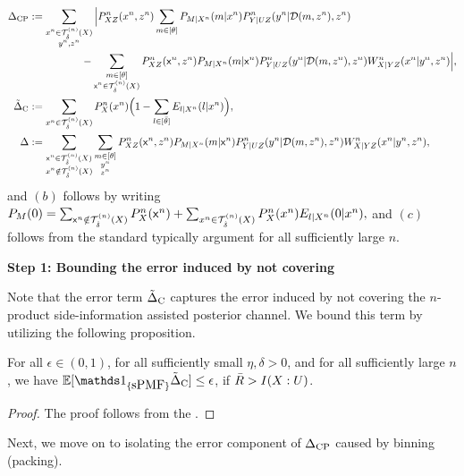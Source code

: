 \begin{align*}
    \Delta_{\text{CP}} &:= \sum_{\substack{x^n \in \mathcal{T}_{\hat{\delta}}^{(n)}({X}) \\ y^n, z^n}}
    \Big|P_{XZ}^n(x^n,z^n) \sum_{m\in [\theta]}P_{M|X^n}(m|x^n) P^n_{Y|UZ}(y^n|\mathcal{D}(m,z^n),z^n) \\
    & \hspace{50pt} - \sum_{\substack{m \in [\theta] \\ \mathsf{x}^n \in \mathcal{T}_{\hat{\delta}}^{(n)}({X})}}  P^n_{XZ}(\mathsf{x}^n,z^n)P_{M|X^n}(m|\mathsf{x}^n) P^n_{Y|UZ}(y^n|\mathcal{D}(m,z^n),z^n) W^n_{X|YZ}(x^n
    |y^n,z^n)
    \Big|,\\
    \Tilde{\Delta}_{\text{C}} &:= \sum_{x^n \in \mathcal{T}_{\hat{\delta}}^{(n)}({X})} P^n_{X}(x^n) \Big(1 - \sum_{l\in[\bar{\theta}]}E_{l|X^n}(l|x^n)\Big),  \\
    {\Delta} &:= \sum_{\substack{\mathsf{x}^n \in \mathcal{T}_{\hat{\delta}}^{(n)}({X}) \\ x^n \notin \mathcal{T}_{\hat{\delta}}^{(n)}({X})}} \sum_{\substack{m \in [\theta] \\y^n \\ z^n }}
     P^n_{XZ}(\mathsf{x}^n,z^n)P_{M|X^n}(m|\mathsf{x}^n) P^n_{Y|UZ}(y^n|\mathcal{D}(m,z^n),z^n) W^n_{X|YZ}(x^n
    |y^n,z^n),
\end{align*}
and $(b)$ follows by writing $P_M(0) = \sum_{\mathsf{x}^n \notin \mathcal{T}_{\hat{\delta}}^{(n)}({X})} P^n_X(\mathsf{x}^n) + \sum_{x^n \in \mathcal{T}_{\hat{\delta}}^{(n)}({X})} P^n_X(x^n)E_{l|X^n}(0|x^n),$ and $(c)$ follows from the standard typically argument for all sufficiently large $n$. 

\noindent \textbf{Step 1: Bounding the error induced by not covering}

\noindent Note that the error term $\Tilde{\Delta}_{\text{C}}$ captures the error induced by not covering the $n$-product side-information assisted posterior channel. We bound this term by utilizing the following proposition.
\begin{proposition} For all $\epsilon \in (0,1)$, for all sufficiently small $\eta,\delta >0$, and for all sufficiently large $n$, we have $\EE[\Ipmf \notce] \leq \epsilon$, if $\bar{R} > I(X:U)$.
\end{proposition}
\begin{proof}
    The proof follows from the \cite[Proposition 8]{atif2023lossy}.
\end{proof}
Next, we move on to isolating the error component of $\Delta_{\text{CP}}$ caused by binning (packing). 

